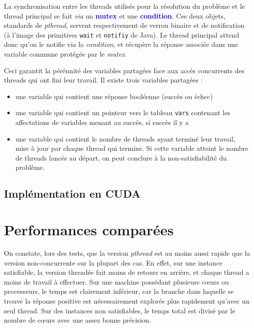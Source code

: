 \documentclass{article}
\newcommand{\keyword}[1]{\textbf{\textcolor{blue}{#1}}}
\newcommand{\code}[1]{\texttt{{#1}}}
\newcommand{\cuda}{\textsc{CUDA}}
\begin{document}
La synchronisation entre les threads utilisés pour la résolution du problème et le thread principal se fait \emph{via} un \keyword{mutex} et une \keyword{condition}. Ces deux objets, standards de \emph{pthread}, servent respectivement de verrou binaire et de notification (à l'image des primitives \code{wait} et \code{notifiy} de Java). Le thread principal attend donc qu'on le notifie via la \emph{condition}, et récupère la réponse associée dans une variable commune protégée par le \emph{mutex}. 

Ceci garantit la pérénnité des variables partagées face aux accès concurrents des threads qui ont fini leur travail. Il existe trois variables partagées :
\begin{itemize}
      \item une variable qui contient une réponse booléenne (succès ou échec)
      \item une variable qui contient un pointeur vers le tableau \code{vars} contenant les affectations de variables menant au succès, si succès il y a
      \item une variable qui contient le nombre de threads ayant terminé leur travail, mise à jour par chaque thread qui termine. Si cette variable atteint le nombre de threads lancés au départ, on peut conclure à la non-satisfiabilité du problème.
\end{itemize}


\subsection{Implémentation en \cuda}



\section{Performances comparées}


    On constate, lors des tests, que la version \emph{pthread} est au moins aussi rapide que la version non-concurrente sur la plupart des cas. En effet, sur une instance satisfiable, la version threadée fait moins de retours en arrière, et chaque thread a moins de travail à effectuer. Sur une machine possédant plusieurs cœurs ou processeurs, le temps est clairement inférieur, car la branche dans laquelle se trouve la réponse positive est nécessairement explorée plus rapidement qu'avec un seul thread. Sur des instances non satisfiables, le temps total est divisé par le nombre de cœurs avec une assez bonne précision.
\end{document}
